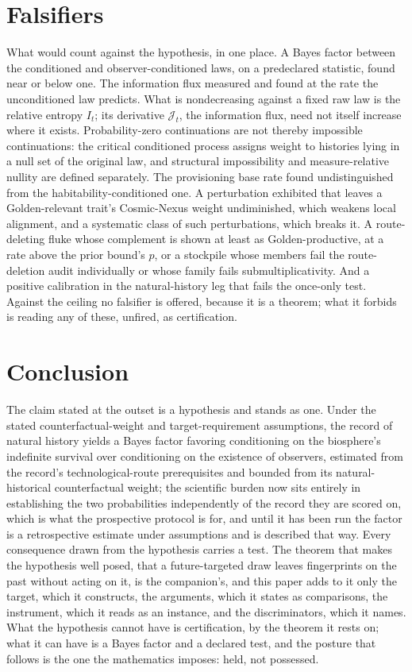\section{Falsifiers}\label{sec:falsifiers}

What would count against the hypothesis, in one place. A Bayes factor
between the conditioned and observer-conditioned laws, on a predeclared
statistic, found near or below one. The information flux measured and
found at the rate the unconditioned law predicts. What is nondecreasing against a fixed raw law is the relative entropy $I_t$; its derivative $\mathcal{J}_t$, the information flux, need not itself increase where it exists. Probability-zero continuations are not thereby impossible continuations: the critical conditioned process assigns weight to histories lying in a null set of the original law, and structural impossibility and measure-relative nullity are defined separately. The provisioning base
rate found undistinguished from the habitability-conditioned one. A
perturbation exhibited that leaves a Golden-relevant trait's Cosmic-Nexus
weight undiminished, which weakens local alignment, and a systematic class
of such perturbations, which breaks it. A route-deleting fluke whose
complement is shown at least as Golden-productive, at a rate above the
prior bound's $p$, or a stockpile whose members fail the route-deletion
audit individually or whose family fails submultiplicativity. And a
positive calibration in the natural-history leg that fails the once-only
test. Against the ceiling no falsifier is offered, because it is a
theorem; what it forbids is reading any of these, unfired, as
certification.

\section{Conclusion}\label{sec:conclusion}

The claim stated at the outset is a hypothesis and stands as one. Under
the stated counterfactual-weight and target-requirement assumptions, the
record of natural history yields a Bayes factor favoring conditioning on
the biosphere's indefinite survival over conditioning on the existence
of observers, estimated from the record's technological-route
prerequisites and bounded from its natural-historical counterfactual
weight; the scientific burden now sits entirely in establishing the two
probabilities independently of the record they are scored on, which is
what the prospective protocol is for, and until it has been run the
factor is a retrospective estimate under assumptions and is described
that way. Every consequence drawn from the hypothesis carries a test. The theorem that makes the hypothesis well posed, that a
future-targeted draw leaves fingerprints on the past without acting on
it, is the companion's, and this paper adds to it only the target, which
it constructs, the arguments, which it states as comparisons, the
instrument, which it reads as an instance, and the discriminators, which
it names. What the hypothesis cannot have is certification, by the
theorem it rests on; what it can have is a Bayes factor and a declared
test, and the posture that follows is the one the mathematics imposes:
held, not possessed.

\printbibliography
